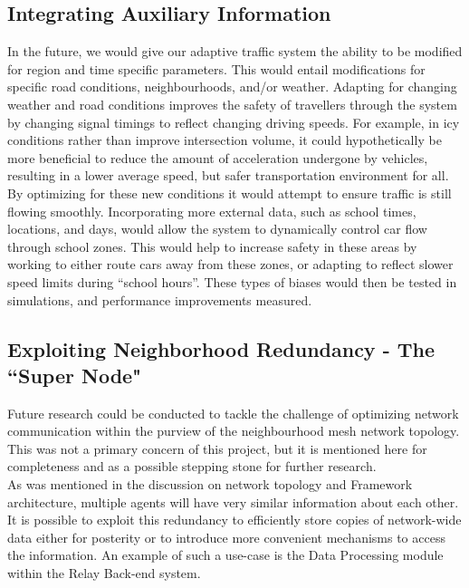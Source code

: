 \documentclass{report}
\begin{document}
\subsection{Integrating Auxiliary Information}
In the future, we would give our adaptive traffic system the ability to be modified for region and time specific parameters. 
This would entail modifications for specific road conditions, neighbourhoods, and/or weather.
Adapting for changing weather and road conditions improves the safety of travellers through the system by changing signal timings to reflect changing driving speeds.
For example, in icy conditions rather than improve intersection volume, it could hypothetically be more beneficial to reduce the amount of acceleration undergone by vehicles, resulting in a lower average speed, but safer transportation environment for all.
By optimizing for these new conditions it would attempt to ensure traffic is still flowing smoothly.
Incorporating more external data, such as school times, locations, and days, would allow the system to dynamically control car flow through school zones.
This would help to increase safety in these areas by working to either route cars away from these zones, or adapting to reflect slower speed limits during ``school hours''.
These types of biases would then be tested in simulations, and performance improvements measured.

\subsection{Exploiting Neighborhood Redundancy - The ``Super Node"}  %
Future research could be conducted to tackle the challenge of optimizing network communication within the purview of the neighbourhood mesh network topology.
This was not a primary concern of this project, but it is mentioned here for completeness and as a possible stepping stone for further research.\\

As was mentioned in the discussion on network topology and Framework architecture, multiple agents will have very similar information about each other.
It is possible to exploit this redundancy to efficiently store copies of network-wide data either for posterity or to introduce more convenient mechanisms to access the information.
An example of such a use-case is the Data Processing module within the Relay Back-end system.\\
\end{document}
